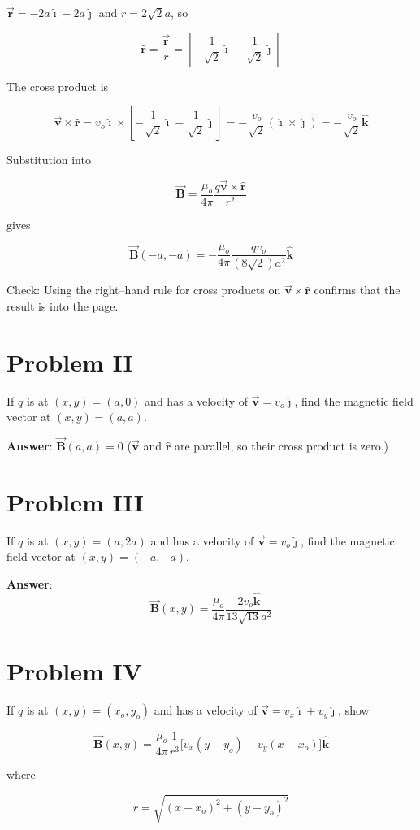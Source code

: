\documentclass{article}
\newcommand{\ihat}[0]{\hat{\boldsymbol{\imath}}}
\newcommand{\jhat}[0]{\hat{\boldsymbol{\jmath}}}
\newcommand{\khat}[0]{\hat{\boldsymbol{k}}}
\newcommand{\bfvec}[1]{\vec{\mathbf{#1}}}
\begin{document}
$\bfvec{r}=-2a\ihat - 2a\jhat$ and $r=2\sqrt{2}a$, so

$$\hat{\mathbf{r}}=\frac{\bfvec{r}}{r} = \left[-\frac{1}{\sqrt{2}}\ihat - \frac{1}{\sqrt{2}}\jhat\right]$$

The cross product is

$$\bfvec{v}\times\hat{\mathbf{r}}=v_o\ihat\times\left[-\frac{1}{\sqrt{2}}\ihat - \frac{1}{\sqrt{2}}\jhat\right] = -\frac{v_o}{\sqrt{2}}(\ihat\times\jhat) = -\frac{v_o}{\sqrt{2}}\khat$$

Substitution into 

$$\bfvec{B} = \frac{\mu_o}{4\pi}\frac{q\bfvec{v}\times\hat{\mathbf{r}}}{r^2}$$

gives

$$\bfvec{B}(-a,-a) = -\frac{\mu_o}{4\pi} \frac{qv_o}{(8\sqrt{2})a^2}\khat$$

Check: Using the right--hand rule for cross products on $\bfvec{v}\times\hat{\mathbf{r}}$ confirms that the result is into the page.
\else
\vskip 288pt
\fi

\section{Problem II}

If $q$ is at $(x,y)=(a,0)$ and has a velocity of $\bfvec{v}=v_o\jhat$, find the magnetic field vector at $(x,y)=(a,a)$.

\ifsolutions
\textbf{Answer}: $\bfvec{B}(a,a)=0$ ($\bfvec{v}$ and $\hat{\mathbf{r}}$ are parallel, so their cross product is zero.)
\else
\vskip 144pt
\fi

\ifsolutions

\else

\newpage
\fi

\section{Problem III}

If $q$ is at $(x,y)=(a,2a)$ and has a velocity of $\bfvec{v}=v_o\jhat$, find the magnetic field vector at $(x,y)=(-a,-a)$.

\ifsolutions
\textbf{Answer}: 
$$\bfvec{B}(x,y)= \frac{\mu_o}{4\pi} \frac{2v_o\khat}{13\sqrt{13}a^2}$$
\else
\vskip 216pt
\fi

\section{Problem IV}

If $q$ is at $(x,y)=(x_o,y_o)$ and has a velocity of $\bfvec{v}=v_x\ihat+v_y\jhat$, show

$$\bfvec{B}(x,y)= \frac{\mu_o}{4\pi} \frac{1}{r^3} \big[v_x(y-y_o) - v_y(x-x_o)\big]\khat$$

where

$$r=\sqrt{(x-x_o)^2+(y-y_o)^2}$$
\end{document}
